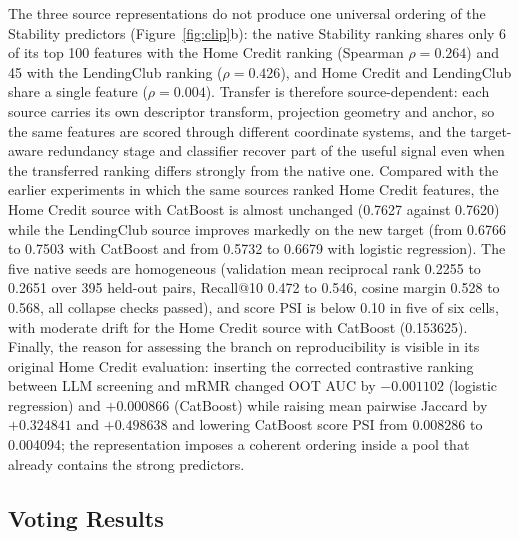 \documentclass[final,5p,twocolumn]{elsarticle}
\begin{document}
The three source representations do not produce one universal ordering of the Stability predictors (Figure~\ref{fig:clip}b): the native Stability ranking shares only 6 of its top 100 features with the Home Credit ranking (Spearman $\rho=0.264$) and 45 with the LendingClub ranking ($\rho=0.426$), and Home Credit and LendingClub share a single feature ($\rho=0.004$). Transfer is therefore source-dependent: each source carries its own descriptor transform, projection geometry and anchor, so the same features are scored through different coordinate systems, and the target-aware redundancy stage and classifier recover part of the useful signal even when the transferred ranking differs strongly from the native one. Compared with the earlier experiments in which the same sources ranked Home Credit features, the Home Credit source with CatBoost is almost unchanged (0.7627 against 0.7620) while the LendingClub source improves markedly on the new target (from 0.6766 to 0.7503 with CatBoost and from 0.5732 to 0.6679 with logistic regression). The five native seeds are homogeneous (validation mean reciprocal rank 0.2255 to 0.2651 over 395 held-out pairs, Recall@10 0.472 to 0.546, cosine margin 0.528 to 0.568, all collapse checks passed), and score PSI is below 0.10 in five of six cells, with moderate drift for the Home Credit source with CatBoost (0.153625). Finally, the reason for assessing the branch on reproducibility is visible in its original Home Credit evaluation: inserting the corrected contrastive ranking between LLM screening and mRMR changed OOT AUC by $-0.001102$ (logistic regression) and $+0.000866$ (CatBoost) while raising mean pairwise Jaccard by $+0.324841$ and $+0.498638$ and lowering CatBoost score PSI from 0.008286 to 0.004094; the representation imposes a coherent ordering inside a pool that already contains the strong predictors.

\subsection{Voting Results}
\label{subsec:voting_results}
\end{document}
